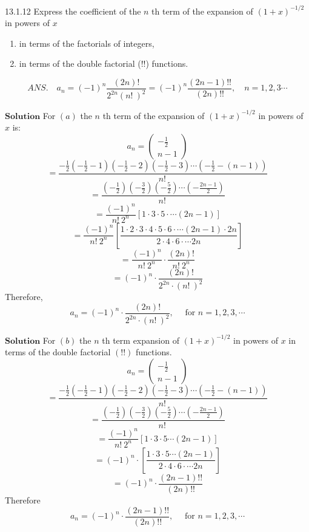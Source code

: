 \documentclass{article}
\begin{document}
\begin{flushleft}
\newpage

\begin{mybox}{13.1.12}
Express the coefficient of the $n$ th term of the expansion of $(1+x)^{-1 / 2}$ in powers of $x$
\begin{enumerate}[$(a)$]
\item in terms of the factorials of integers,
\item in terms of the double factorial
(!!) functions.
\end{enumerate}
$$
A N S . \quad a_{n}=(-1)^{n} \frac{(2 n) !}{2^{2 n}(n! \ )^{2}}=(-1)^{n} \frac{(2 n-1) ! !}{(2 n) ! !}, \quad n=1,2,3  \cdots
$$
\end{mybox}

$\boxed{\textbf{Solution}}$ For $(a)$ the $n$ th term of the expansion of $(1+x)^{-1 / 2}$ in powers of $x$ is:
$$
a_{n}=\left(\begin{array}{c}
-\frac{1}{2} \\
n-1
\end{array}\right)
$$
$$
=\frac{-\frac{1}{2}\left(-\frac{1}{2}-1\right)\left(-\frac{1}{2}-2\right)\left(-\frac{1}{2}-3\right) \cdots\left(-\frac{1}{2}-(n-1)\right)}{n! \ }
$$
$$
=\frac{\left(-\frac{1}{2}\right)\left(-\frac{3}{2}\right)\left(-\frac{5}{2}\right) \cdots\left(-\frac{2 n-1}{2}\right)}{n! \ }
$$
$$
=\frac{(-1)^{n}}{n! \  2^{n}}[1 \cdot 3  \cdot 5  \cdot   \cdots (2 n-1)]
$$
$$
=\frac{(-1)^{n}}{n! \  2^{n}}\left[\frac{1 \cdot 2  \cdot 3  \cdot 4  \cdot 5  \cdot 6  \cdot   \cdots (2 n-1) \cdot 2 n}{2 \cdot 4  \cdot 6  \cdot   \cdots 2 n}\right]
$$
$$=\frac{(-1)^{n}}{n! \  2^{n}} \cdot \frac{(2 n) !}{n! \  2^{n}}$$
$$=(-1)^{n} \cdot \frac{(2 n) !}{2^{2 n} \cdot(n! \ )^{2}}$$
Therefore, 
$$
a_{n}=(-1)^{n} \cdot \frac{(2 n) !}{2^{2 n} \cdot(n! \ )^{2}}, \quad \text { for } n=1,2,3, \cdots
$$

$\boxed{\textbf{Solution}}$ For $(b)$ the $n$ th term expansion of $(1+x)^{-1 / 2}$ in powers of $x$ in terms of the double factorial $(!!)$ functions.
$$
a_{n}=\left(\begin{array}{c}
-\frac{1}{2} \\
n-1
\end{array}\right)
$$
$$
=\frac{-\frac{1}{2}\left(-\frac{1}{2}-1\right)\left(-\frac{1}{2}-2\right)\left(-\frac{1}{2}-3\right) \cdots\left(-\frac{1}{2}-(n-1)\right)}{n! \ }
$$
$$
=\frac{\left(-\frac{1}{2}\right)\left(-\frac{3}{2}\right)\left(-\frac{5}{2}\right) \cdots\left(-\frac{2 n-1}{2}\right)}{n! \ }
$$
$$=\frac{(-1)^{n}}{n! \  2^{n}}[1 \cdot 3  \cdot 5   \cdots (2 n-1)]$$
$$=(-1)^{n} \cdot\left[\frac{1 \cdot 3  \cdot 5   \cdots (2 n-1)}{2 \cdot 4  \cdot 6  \cdot   \cdots 2 n}\right]$$
$$=(-1)^{n} \cdot \frac{(2 n-1) ! !}{(2 n) ! !}$$
Therefore
$$
a_{n}=(-1)^{n} \cdot \frac{(2 n-1) ! !}{(2 n) ! !}, \quad \text { for } n=1,2,3, \cdots
$$


\end{flushleft}
\end{document}
